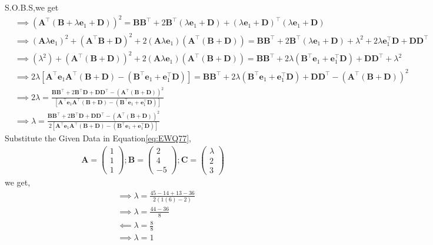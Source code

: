 \documentclass[8pt, a4paper]{article}
\newcommand{\myvec}[1]{\ensuremath{\begin{pmatrix}#1\end{pmatrix}}}
\let\vec\mathbf
\providecommand{\brak}[1]{\ensuremath{\left(#1\right)}}
\providecommand{\sbrak}[1]{\ensuremath{{}\left[#1\right]}}
\begin{document}
\begin{enumerate}
S.O.B.S,we get
\begin{align}
&\implies\brak{\vec{A}^{\top}\brak{\vec{B}+\lambda\vec{e}_1+\vec{D}}}^{2}=\vec{B}\vec{B}^{\top}+2\vec{B}^{\top}\brak{\lambda\vec{e}_1+\vec{D}}+\brak{\lambda\vec{e}_1+\vec{D}}^{\top}\brak{\lambda\vec{e}_1+\vec{D}} \\
&\implies\brak{\vec{A}\lambda\vec{e}_1}^{2}+\brak{\vec{A}^{\top}\vec{B}+\vec{D}}^{2}+2\brak{\vec{A}\lambda\vec{e}_1}\brak{\vec{A}^{\top}\brak{\vec{B}+\vec{D}}}=\vec{B}\vec{B}^{\top}+2\vec{B}^{\top}\brak{\lambda\vec{e}_1+\vec{D}}+\lambda^{2}+2\lambda\vec{e}_1^{\top}\vec{D}+\vec{D}\vec{D}^{\top}\\
&\implies\brak{\lambda^{2}}+\brak{\vec{A}^{\top}\brak{\vec{B}+\vec{D}}}^{2}+2\brak{\vec{A}\lambda\vec{e}_1}\brak{\vec{A}^{\top}\brak{\vec{B}+\vec{D}}}=\vec{B}\vec{B}^{\top}+2\lambda\brak{\vec{B}^{\top}\vec{e}_1+\vec{e}_1^{\top}\vec{D}}+\vec{D}\vec{D}^{\top}+\lambda^{2}\\
&\implies2\lambda\sbrak{\vec{A}^\top\vec{e}_1\vec{A}^\top\brak{\vec{B}+\vec{D}}-\brak{\vec{B}^{\top}\vec{e}_1+\vec{e}_1^{\top}\vec{D}}}=\vec{B}\vec{B}^{\top}+2\lambda\brak{\vec{B}^{\top}\vec{e}_1+\vec{e}_1^{\top}\vec{D}}+\vec{D}\vec{D}^{\top}-\brak{\vec{A}^{\top}\brak{\vec{B}+\vec{D}}}^{2}\\
&\implies2\lambda=\frac{\vec{B}\vec{B}^{\top}+2\vec{B}^{\top}\vec{D}+\vec{D}\vec{D}^{\top}-\brak{\vec{A}^{\top}\brak{\vec{B}+\vec{D}}}^{2}}{\sbrak{\vec{A}^\top\vec{e}_1\vec{A}^\top\brak{\vec{B}+\vec{D}}-\brak{\vec{B}^{\top}\vec{e}_1+\vec{e}_1^{\top}\vec{D}}}}\\
&\implies\lambda=\frac{\vec{B}\vec{B}^{\top}+2\vec{B}^{\top}\vec{D}+\vec{D}\vec{D}^{\top}-\brak{\vec{A}^{\top}\brak{\vec{B}+\vec{D}}}^{2}}{2\sbrak{\vec{A}^\top\vec{e}_1\vec{A}^\top\brak{\vec{B}+\vec{D}}-\brak{\vec{B}^{\top}\vec{e}_1+\vec{e}_1^{\top}\vec{D}}}} \label{eq:EWQ77}
\end{align}
Substitute the Given Data in Equation\eqref{eq:EWQ77},
\begin{align*}
\vec{A}=\myvec{1\\1\\1};\vec{B}=\myvec{2\\4\\-5};\vec{C}=\myvec{\lambda\\2\\3}
\end{align*}
we get,
\begin{align}   
&\implies\lambda=\frac{45-14+13-36}{2\brak{1\brak{6}-2}}\\
&\implies\lambda=\frac{44-36}{8}\\
&\impliedby\lambda=\frac{8}{8}\\
 &\implies \lambda = 1
\end{align}
\end{enumerate}
\end{document}
